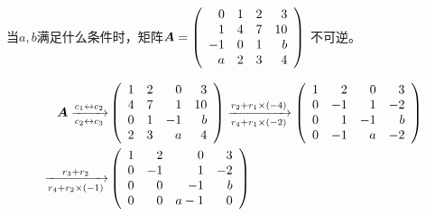 \begin{li}
  当$a,b$满足什么条件时，矩阵$\boldsymbol{A}=\left(
    \begin{array}{rrrr}
      0&1&2&3\\
      1&4&7&10\\
      -1&0&1&b\\
      a&2&3&4
    \end{array}
  \right)$
  不可逆。
\end{li}
\begin{jie}
$$
\begin{aligned}
  \boldsymbol{A}\xrightarrow[c_2\leftrightarrow c_3]{c_1\leftrightarrow c_2} &
  \left(
    \begin{array}{rrrr}
      1 & 2 & 0 & 3\\
      4 & 7 & 1 & 10\\
      0 & 1 & -1 & b\\
      2 & 3 & a & 4\\
    \end{array}
  \right)
  \xrightarrow[r_4+r_1\times(-2)]{r_2+r_1\times(-4)}
  \left(
    \begin{array}{rrrr}
      1 & 2 & 0 & 3\\
      0 & -1 & 1 & -2\\
      0 & 1 & -1 & b\\
      0 & -1 & a & -2\\
    \end{array}
  \right)\\
  \xrightarrow[r_4+r_2\times(-1)]{r_3+r_2}&
  \left(
    \begin{array}{rrrr}      
      1 & 2 & 0 & 3\\
      0 & -1 & 1 & -2\\
      0 & 0 & -1 & b\\
      0 & 0 & a-1 & 0\\
    \end{array}
  \right)
\end{aligned}
$$
\end{jie}


